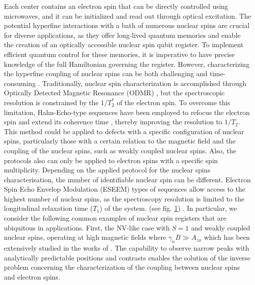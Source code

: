 \documentclass[%
 reprint,
superscriptaddress,
 amsmath,amssymb,
 aps,
]{revtex4-2}
\begin{document}
\begin{figure}
\begin{center}
		\label{fig:1}
	\end{center}
\end{figure}

Each center contains an electron spin that can be directly controlled using microwaves, and it can be initialized and read out through optical excitation. 
The potential hyperfine interactions with a bath of numerous nuclear spins are crucial for diverse applications, as they offer long-lived quantum memories and enable the creation of an optically accessible nuclear spin qubit register.
To implement efficient quantum control for these memories, it is imperative to have precise knowledge of the full Hamiltonian governing the register.
However, characterizing the hyperfine coupling of nuclear spins can be both challenging and time-consuming \cite{abobeih2019atomic, van2023mapping}. 
Traditionally, nuclear spin characterization is accomplished through Optically Detected Magnetic Resonance (ODMR) \cite{Dreau:2012aa,hesselmeier2023measuring}, but the spectroscopic resolution is constrained by the $1/T_2^\ast$ of the electron spin. 
To overcome this limitation, Hahn-Echo-type sequences have been employed to refocus the electron spin and extend its coherence time \cite{childress2006coherent}, thereby improving the resolution to $1/T_2$. 
This method could be applied to defects with a specific configuration of nuclear spins, particularly those with a certain relation to the magnetic field and the coupling of the nuclear spins, such as weakly coupled nuclear spins.
Also, the protocols also can only be applied to electron spins with a specific spin multiplicity.
Depending on the applied protocol for the nuclear spins characterisation, the number of identifiable nuclear spin can be different.
Electron Spin Echo Envelop Modulation (ESEEM) types of sequences allow access to the highest number of nuclear spins, as the spectroscopy resolution is limited to the longitudinal relaxation time ($T_1$) of the system. (see fig. \ref{fig:1}) \cite{laraoui2013high, vorobyov2022addressing}.
In particular, we consider the following common examples of nuclear spin registers that are ubiquitous in applications. First, the NV-like case with $S=1$ and weakly coupled nuclear spins, operating at high magnetic fields where $\gamma_n B \gg A_{zx}$ which has been extensively studied in the works of \cite{abobeih2019atomic, taminiau2012detection, Zhao:2014aa}.
The capability to observe narrow peaks with analytically predictable positions and contrasts enables the solution of the inverse problem concerning the characterization of the coupling between nuclear spins and electron spins. 
\end{document}
